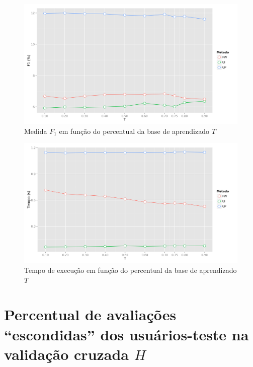 \begin{figure}[htp]
    \begin{center}
    \includegraphics[width=1\textwidth]{img/F1_T}
    \end{center}
    \label{fig:F1_T}
    \caption{Medida $F_1$ em função do percentual da base de aprendizado $T$}
\end{figure}

\begin{figure}[htp]
    \begin{center}
    \includegraphics[width=1\textwidth]{img/time_T}
    \end{center}
    \label{fig:time_T}
    \caption{Tempo de execução em função do percentual da base de aprendizado $T$}
\end{figure}


\section{Percentual de avaliações ``escondidas'' dos usuários-teste na validação cruzada $H$} %
\label{sec:percentual_de_avalia_es_dos_usu_rios_teste_na_valida_o_cruzada}

